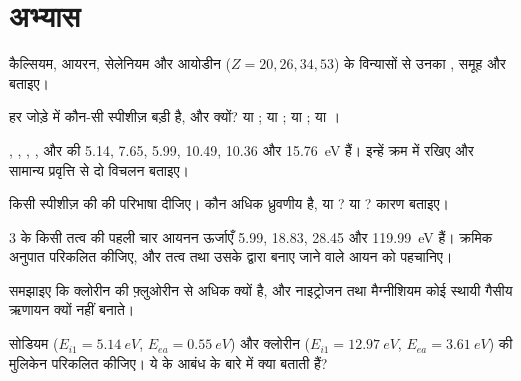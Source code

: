 \section{अभ्यास}

\begin{exercise}[$\star$]\label{exo:b1:periodicity:1}
कैल्सियम, आयरन, सेलेनियम और आयोडीन ($Z = 20, 26, 34, 53$) के विन्यासों से
उनका , समूह और  बताइए।
\end{exercise}

\begin{exercise}[$\star$]\label{exo:b1:periodicity:2}
हर जोड़े में कौन-सी स्पीशीज़ बड़ी है, और क्यों?  या ;
 या ;  या ;  या ।
\end{exercise}

\begin{exercise}[$\star$]\label{exo:b1:periodicity:3}
, , , ,
 और  की  5.14, 7.65, 5.99, 10.49, 10.36 और
\qty{15.76}{eV} हैं। इन्हें क्रम में रखिए और सामान्य प्रवृत्ति से दो विचलन
बताइए।
\end{exercise}

\begin{exercise}[$\star$]\label{exo:b1:periodicity:4}
किसी स्पीशीज़ की  की परिभाषा दीजिए। कौन अधिक ध्रुवणीय है, 
या ?  या ? कारण बताइए।
\end{exercise}

\begin{exercise}[$\star\star$]\label{exo:b1:periodicity:5}
 3 के किसी तत्व की पहली चार आयनन ऊर्जाएँ 5.99,
18.83, 28.45 और \qty{119.99}{eV} हैं। क्रमिक अनुपात परिकलित कीजिए, और
तत्व तथा उसके द्वारा बनाए जाने वाले आयन को पहचानिए।
\end{exercise}

\begin{exercise}[$\star\star$]\label{exo:b1:periodicity:6}
समझाइए कि क्लोरीन की  फ़्लुओरीन से अधिक क्यों है, और
नाइट्रोजन तथा मैग्नीशियम कोई स्थायी गैसीय ऋणायन क्यों नहीं बनाते।
\end{exercise}

\begin{exercise}[$\star\star$]\label{exo:b1:periodicity:7}
सोडियम ($E_{i1} =
\qty{5.14}{eV}$, $E_{ea} = \qty{0.55}{eV}$) और क्लोरीन ($E_{i1} =
\qty{12.97}{eV}$, $E_{ea} = \qty{3.61}{eV}$) की मुलिकेन  परिकलित
कीजिए। ये  के आबंध के बारे में क्या बताती हैं?
\end{exercise}

